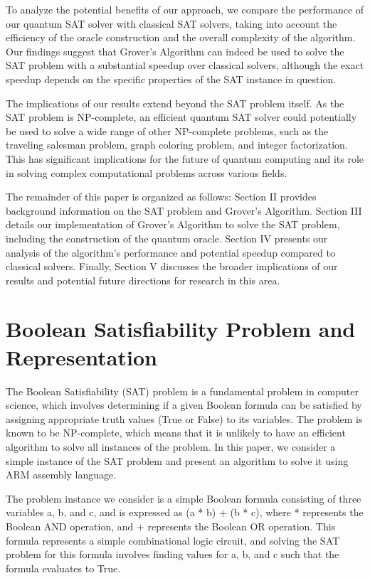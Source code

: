 To analyze the potential benefits of our approach, we compare the performance of our quantum SAT solver with classical SAT solvers, taking into account the efficiency of the oracle construction and the overall complexity of the algorithm. Our findings suggest that Grover's Algorithm can indeed be used to solve the SAT problem with a substantial speedup over classical solvers, although the exact speedup depends on the specific properties of the SAT instance in question.

The implications of our results extend beyond the SAT problem itself. As the SAT problem is NP-complete, an efficient quantum SAT solver could potentially be used to solve a wide range of other NP-complete problems, such as the traveling salesman problem, graph coloring problem, and integer factorization. This has significant implications for the future of quantum computing and its role in solving complex computational problems across various fields.

The remainder of this paper is organized as follows: Section II provides background information on the SAT problem and Grover's Algorithm. Section III details our implementation of Grover's Algorithm to solve the SAT problem, including the construction of the quantum oracle. Section IV presents our analysis of the algorithm's performance and potential speedup compared to classical solvers. Finally, Section V discusses the broader implications of our results and potential future directions for research in this area.

\section{Boolean Satisfiability Problem and Representation}

The Boolean Satisfiability (SAT) problem is a fundamental problem in computer science, which involves determining if a given Boolean formula can be satisfied by assigning appropriate truth values (True or False) to its variables. The problem is known to be NP-complete, which means that it is unlikely to have an efficient algorithm to solve all instances of the problem. In this paper, we consider a simple instance of the SAT problem and present an algorithm to solve it using ARM assembly language.

The problem instance we consider is a simple Boolean formula consisting of three variables a, b, and c, and is expressed as (a * b) + (b * c), where * represents the Boolean AND operation, and + represents the Boolean OR operation. This formula represents a simple combinational logic circuit, and solving the SAT problem for this formula involves finding values for a, b, and c such that the formula evaluates to True.

